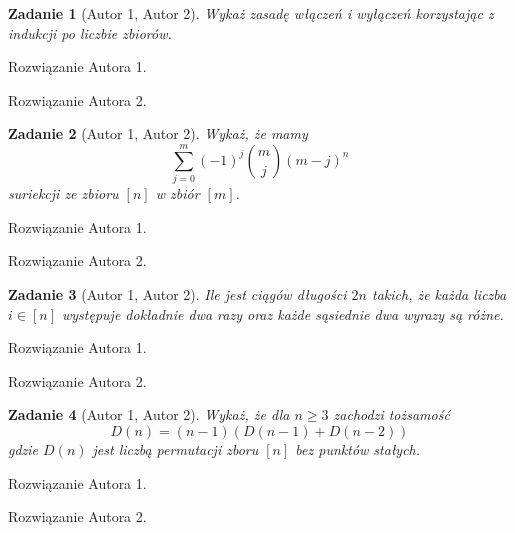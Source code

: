 \documentclass{mwart}
\newtheorem{zad}{Zadanie}[section]
\begin{document}
\begin{zad}[Autor 1, Autor 2]
    Wykaż zasadę włączeń i wyłączeń korzystając z indukcji po liczbie zbiorów.
\end{zad}
\begin{mdframed}
    Rozwiązanie Autora 1.
\end{mdframed}
\begin{mdframed}
    Rozwiązanie Autora 2.
\end{mdframed}




\begin{zad}[Autor 1, Autor 2]
    Wykaż, że mamy
    \[
        \sum_{j=0}^{m}(-1)^j \binom{m}{j}(m-j)^n
    \]
    suriekcji ze zbioru $[n]$ w zbiór $[m]$.
\end{zad}
\begin{mdframed}
    Rozwiązanie Autora 1.
\end{mdframed}
\begin{mdframed}
    Rozwiązanie Autora 2.
\end{mdframed}



\begin{zad}[Autor 1, Autor 2]
    Ile jest ciągów długości $2n$ takich, że każda liczba $i \in [n]$
    występuje dokładnie dwa razy oraz każde sąsiednie dwa wyrazy są różne.
\end{zad}
\begin{mdframed}
    Rozwiązanie Autora 1.
\end{mdframed}
\begin{mdframed}
    Rozwiązanie Autora 2.
\end{mdframed}




\begin{zad}[Autor 1, Autor 2]
    Wykaż, że dla $n \geq 3$ zachodzi tożsamość
    \[
        D(n) = (n-1)(D(n-1) + D(n-2))
    \]
    gdzie $D(n)$ jest liczbą permutacji zboru $[n]$ bez punktów stałych.
\end{zad}
\begin{mdframed}
    Rozwiązanie Autora 1.
\end{mdframed}
\begin{mdframed}
    Rozwiązanie Autora 2.
\end{mdframed}
\end{document}
